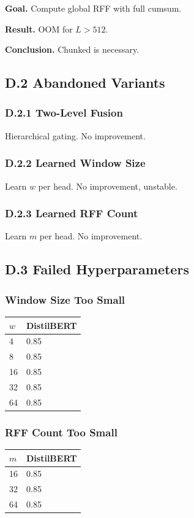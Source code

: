 \textbf{Goal.} Compute global RFF with full cumsum.

\textbf{Result.} OOM for $L > 512$.

\textbf{Conclusion.} Chunked is necessary.

\subsection{D.2 Abandoned Variants}

\subsubsection{D.2.1 Two-Level Fusion}

Hierarchical gating. No improvement.

\subsubsection{D.2.2 Learned Window Size}

Learn $w$ per head. No improvement, unstable.

\subsubsection{D.2.3 Learned RFF Count}

Learn $m$ per head. No improvement.

\subsection{D.3 Failed Hyperparameters}

\subsubsection{Window Size Too Small}
\begin{table}[H]
\centering
\small
\begin{tabular}{ll}
\toprule
\textbf{$w$} & \textbf{DistilBERT} \\
\midrule
4 & 0.85 \\
8 & 0.85 \\
16 & 0.85 \\
32 & 0.85 \\
64 & 0.85 \\
\bottomrule
\end{tabular}
\end{table}

\subsubsection{RFF Count Too Small}
\begin{table}[H]
\centering
\small
\begin{tabular}{ll}
\toprule
\textbf{$m$} & \textbf{DistilBERT} \\
\midrule
16 & 0.85 \\
32 & 0.85 \\
64 & 0.85 \\
\bottomrule
\end{tabular}
\end{table}

